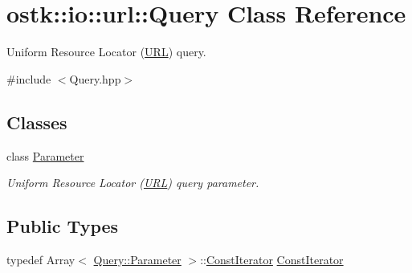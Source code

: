 \hypertarget{classostk_1_1io_1_1url_1_1_query}{}\section{ostk\+:\+:io\+:\+:url\+:\+:Query Class Reference}
\label{classostk_1_1io_1_1url_1_1_query}


Uniform Resource Locator (\hyperlink{classostk_1_1io_1_1_u_r_l}{U\+RL}) query.  




{\ttfamily \#include $<$Query.\+hpp$>$}

\subsection*{Classes}
\begin{DoxyCompactItemize}
\item 
class \hyperlink{classostk_1_1io_1_1url_1_1_query_1_1_parameter}{Parameter}
\begin{DoxyCompactList}\small\item\em Uniform Resource Locator (\hyperlink{classostk_1_1io_1_1_u_r_l}{U\+RL}) query parameter. \end{DoxyCompactList}\end{DoxyCompactItemize}
\subsection*{Public Types}
\begin{DoxyCompactItemize}
\item 
typedef Array$<$ \hyperlink{classostk_1_1io_1_1url_1_1_query_1_1_parameter}{Query\+::\+Parameter} $>$\+::\hyperlink{classostk_1_1io_1_1url_1_1_query_a64eb73f998c55a48d25b4ce116d66f1a}{Const\+Iterator} \hyperlink{classostk_1_1io_1_1url_1_1_query_a64eb73f998c55a48d25b4ce116d66f1a}{Const\+Iterator}
\end{DoxyCompactItemize}
